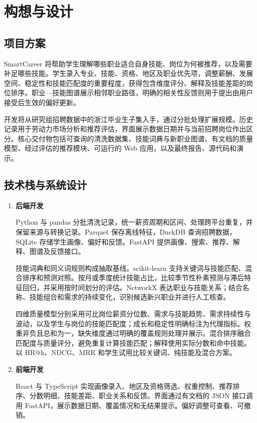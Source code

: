 \documentclass[a4paper,12pt]{article}
\begin{document}
\newpage

\section{构想与设计}
\subsection{项目方案}
SmartCareer 将帮助学生理解哪些职业适合自身技能、岗位为何被推荐，以及需要补足哪些技能。学生录入专业、技能、资格、地区及职业优先项，调整薪酬、发展空间、稳定性和技能匹配度的重要程度，获得包含维度评分、解释及技能差距的岗位排序。职业—技能图谱展示相邻职业路径，明确的相关性反馈则用于提出由用户接受后生效的偏好更新。

开发将从研究组招聘数据中的浙江毕业生子集入手，通过分批处理扩展规模。历史记录用于劳动力市场分析和推荐评估，界面展示数据日期并与当前招聘岗位作出区分。核心交付物包括可查询的清洗数据集、技能词典与新职业图谱、有文档的质量模型、经过评估的推荐模块、可运行的 Web 应用，以及最终报告、源代码和演示。

\subsection{技术栈与系统设计}
\begin{enumerate}
  \item \textbf{后端开发}\par
  Python 与 pandas 分批清洗记录，统一薪资周期和区间、处理跨平台重复，并保留来源与转换记录。Parquet 保存离线特征，DuckDB 查询招聘数据，SQLite 存储学生画像、偏好和反馈。FastAPI 提供画像、搜索、推荐、解释、图谱及反馈接口。

  技能词典和同义词规则构成抽取基线。scikit-learn 支持关键词与技能匹配、混合排序和预测对照。按月或季度统计技能占比，比较季节性朴素预测与滞后特征回归，并采用按时间划分的评估。NetworkX 表达职业与技能关系；结合名称、技能组合和需求的持续变化，识别候选新兴职业并进行人工核查。

  四维质量模型分别采用可比岗位薪资分位数、需求与技能趋势、需求持续性与波动，以及学生与岗位的技能匹配度；成长和稳定性明确标注为代理指标。权重非负且总和为一，缺失维度通过明确的覆盖规则处理并展示。混合排序融合匹配度与质量评分，避免重复计算技能匹配；解释使用实际分数和命中技能。以 HR@k、NDCG、MRR 和学生试用比较关键词、纯技能及混合方案。

  \item \textbf{前端开发}\par
  React 与 TypeScript 实现画像录入、地区及资格筛选、权重控制、推荐排序、分数明细、技能差距、职业关系和反馈。界面通过有文档的 JSON 接口调用 FastAPI，展示数据日期、覆盖情况和无结果提示。偏好调整可查看、可撤销。
\end{enumerate}
\end{document}
